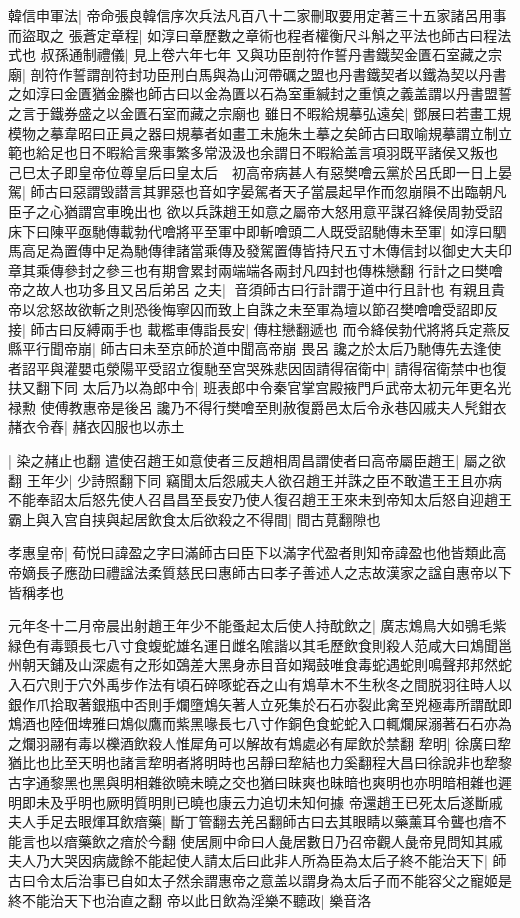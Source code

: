 韓信申軍法|{
	帝命張良韓信序次兵法凡百八十二家刪取要用定著三十五家諸呂用事而盜取之}
張蒼定章程|{
	如淳曰章歷數之章術也程者權衡尺斗斛之平法也師古曰程法式也}
叔孫通制禮儀|{
	見上卷六年七年}
又與功臣剖符作誓丹書鐵契金匱石室藏之宗廟|{
	剖符作誓謂剖符封功臣刑白馬與為山河帶礪之盟也丹書鐵契者以鐵為契以丹書之如淳曰金匱猶金縢也師古曰以金為匱以石為室重緘封之重慎之義盖謂以丹書盟誓之言于鐵券盛之以金匱石室而藏之宗廟也}
雖日不暇給規摹弘遠矣|{
	鄧展曰若畫工規模物之摹韋昭曰正員之器曰規摹者如畫工未施朱土摹之矣師古曰取喻規摹謂立制立範也給足也日不暇給言衆事繁多常汲汲也余謂日不暇給盖言項羽既平諸侯又叛也}
己巳太子即皇帝位尊皇后曰皇太后　初高帝病甚人有惡樊噲云黨於呂氏即一日上晏駕|{
	師古曰惡謂毁譛言其罪惡也音如字晏駕者天子當晨起早作而忽崩隕不出臨朝凡臣子之心猶謂宫車晚出也}
欲以兵誅趙王如意之屬帝大怒用意平謀召絳侯周勃受詔床下曰陳平亟馳傳載勃代噲將平至軍中即斬噲頭二人既受詔馳傳未至軍|{
	如淳曰駟馬高足為置傳中足為馳傳律諸當乘傳及發駕置傳皆持尺五寸木傳信封以御史大夫印章其乘傳參封之參三也有期會累封兩端端各兩封凡四封也傳株戀翻}
行計之曰樊噲帝之故人也功多且又呂后弟呂之夫|{
	音須師古曰行計謂于道中行且計也}
有親且貴帝以忿怒故欲斬之則恐後悔寧囚而致上自誅之未至軍為壇以節召樊噲噲受詔即反接|{
	師古曰反縛兩手也}
載檻車傳詣長安|{
	傳柱戀翻遞也}
而令絳侯勃代將將兵定燕反縣平行聞帝崩|{
	師古曰未至京師於道中聞高帝崩}
畏呂讒之於太后乃馳傳先去逢使者詔平與灌嬰屯滎陽平受詔立復馳至宫哭殊悲因固請得宿衛中|{
	請得宿衛禁中也復扶又翻下同}
太后乃以為郎中令|{
	班表郎中令秦官掌宫殿掖門戶武帝太初元年更名光禄勲}
使傅教惠帝是後呂讒乃不得行樊噲至則赦復爵邑太后令永巷囚戚夫人髠鉗衣赭衣令舂|{
	赭衣囚服也以赤土}


|{
	染之赭止也翻}
遣使召趙王如意使者三反趙相周昌謂使者曰高帝屬臣趙王|{
	屬之欲翻}
王年少|{
	少詩照翻下同}
竊聞太后怨戚夫人欲召趙王并誅之臣不敢遣王王且亦病不能奉詔太后怒先使人召昌昌至長安乃使人復召趙王王來未到帝知太后怒自迎趙王霸上與入宫自挟與起居飲食太后欲殺之不得間|{
	間古莧翻隙也}


孝惠皇帝|{
	荀悦曰諱盈之字曰滿師古曰臣下以滿字代盈者則知帝諱盈也他皆類此高帝嫡長子應劭曰禮諡法柔質慈民曰惠師古曰孝子善述人之志故漢家之諡自惠帝以下皆稱孝也}


元年冬十二月帝晨出射趙王年少不能蚤起太后使人持酖飲之|{
	廣志鴆鳥大如鴞毛紫緑色有毒頸長七八寸食蝮蛇雄名運日雌名隂諧以其毛歷飲食則殺人范咸大曰鴆聞邕州朝天鋪及山深處有之形如鵶差大黑身赤目音如羯鼓唯食毒蛇遇蛇則鳴聲邦邦然蛇入石穴則于穴外禹步作法有頃石碎啄蛇吞之山有鴆草木不生秋冬之間脱羽往時人以銀作爪拾取著銀瓶中否則手爛墮鴆矢著人立死集於石石亦裂此禽至兇極毒所謂酖即鴆酒也陸佃埤雅曰鴆似鷹而紫黑喙長七八寸作銅色食蛇蛇入口輒爛屎溺著石石亦為之爛羽翮有毒以櫟酒飲殺人惟犀角可以解故有鴆處必有犀飲於禁翻}
犂明|{
	徐廣曰犂猶比也比至天明也諸言犂明者將明時也呂靜曰犂結也力奚翻程大昌曰徐說非也犂黎古字通黎黑也黑與明相雜欲曉未曉之交也猶曰昧爽也昧暗也爽明也亦明暗相雜也遲明即未及乎明也厥明質明則已曉也康云力追切未知何據}
帝還趙王已死太后遂斷戚夫人手足去眼煇耳飲瘖藥|{
	斷丁管翻去羌呂翻師古曰去其眼睛以藥薰耳令聾也瘖不能言也以瘖藥飲之瘖於今翻}
使居厠中命曰人彘居數日乃召帝觀人彘帝見問知其戚夫人乃大哭因病歲餘不能起使人請太后曰此非人所為臣為太后子終不能治天下|{
	師古曰令太后治事已自如太子然余謂惠帝之意盖以謂身為太后子而不能容父之寵姬是終不能治天下也治直之翻}
帝以此日飲為淫樂不聽政|{
	樂音洛}


